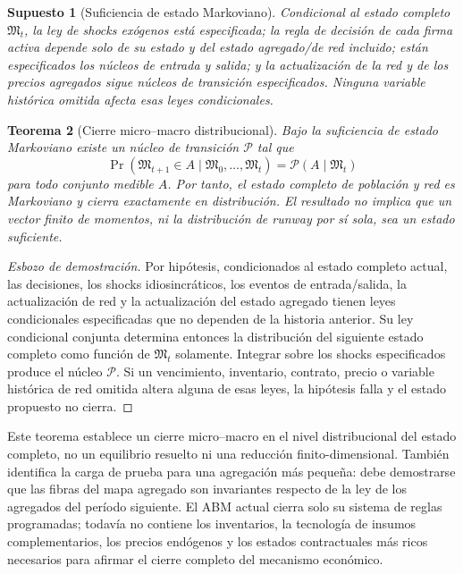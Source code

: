 \documentclass[11pt,a4paper]{article}
\newtheorem{theorem}{Teorema}[section]
\newtheorem{assumption}[theorem]{Supuesto}
\begin{document}
\begin{assumption}[Suficiencia de estado Markoviano]
Condicional al estado completo $\mathfrak M_t$, la ley de shocks exógenos está especificada; la regla de decisión de cada firma activa depende solo de su estado y del estado agregado/de red incluido; están especificados los núcleos de entrada y salida; y la actualización de la red y de los precios agregados sigue núcleos de transición especificados. Ninguna variable histórica omitida afecta esas leyes condicionales.
\end{assumption}

\begin{theorem}[Cierre micro--macro distribucional]
Bajo la suficiencia de estado Markoviano existe un núcleo de transición $\mathcal P$ tal que
\[
\Pr(\mathfrak M_{t+1}\in A\mid\mathfrak M_0,\ldots,\mathfrak M_t)=\mathcal P(A\mid\mathfrak M_t)
\]
para todo conjunto medible $A$. Por tanto, el estado completo de población y red es Markoviano y cierra exactamente en distribución. El resultado no implica que un vector finito de momentos, ni la distribución de runway por sí sola, sea un estado suficiente.
\end{theorem}

\begin{proof}[Esbozo de demostración]
Por hipótesis, condicionados al estado completo actual, las decisiones, los shocks idiosincráticos, los eventos de entrada/salida, la actualización de red y la actualización del estado agregado tienen leyes condicionales especificadas que no dependen de la historia anterior. Su ley condicional conjunta determina entonces la distribución del siguiente estado completo como función de $\mathfrak M_t$ solamente. Integrar sobre los shocks especificados produce el núcleo $\mathcal P$. Si un vencimiento, inventario, contrato, precio o variable histórica de red omitida altera alguna de esas leyes, la hipótesis falla y el estado propuesto no cierra.
\end{proof}

Este teorema establece un cierre micro--macro en el nivel distribucional del estado completo, no un equilibrio resuelto ni una reducción finito-dimensional. También identifica la carga de prueba para una agregación más pequeña: debe demostrarse que las fibras del mapa agregado son invariantes respecto de la ley de los agregados del período siguiente. El ABM actual cierra solo su sistema de reglas programadas; todavía no contiene los inventarios, la tecnología de insumos complementarios, los precios endógenos y los estados contractuales más ricos necesarios para afirmar el cierre completo del mecanismo económico.
\end{document}

